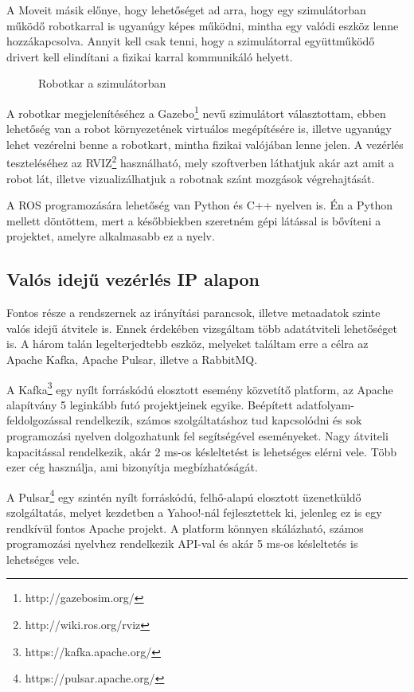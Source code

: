\documentclass[11pt,a4paper,oneside]{article}
\newcommand{\insertfig}[4]{
	\vspace*{2mm}
	\begin{figure}[#4]
		\center
		\resizebox{#3}{!}{\texttt{[image: images/\#1]}}
		\parbox{0.8\textwidth}{\vspace*{4mm}\caption{{#2}}\small\label{fig:#1}}
	\end{figure}
	\vspace*{-2\parskip}
}
\begin{document}
A Moveit másik előnye, hogy lehetőséget ad arra, hogy egy szimulátorban működő robotkarral is ugyanúgy képes működni, mintha egy valódi eszköz lenne hozzákapcsolva. Annyit kell csak tenni, hogy a szimulátorral együttműködő drivert kell elindítani a fizikai karral kommunikáló helyett.

\insertfig{ur5e_sim}{Robotkar a szimulátorban}{6cm}{h!}

A robotkar megjelenítéséhez a Gazebo\footnote{http://gazebosim.org/} nevű szimulátort választottam, ebben lehetőség van a robot környezetének virtuálos megépítésére is, illetve ugyanúgy lehet vezérelni benne a robotkart, mintha fizikai valójában lenne jelen. A vezérlés teszteléséhez az RVIZ\footnote{http://wiki.ros.org/rviz} használható, mely szoftverben láthatjuk akár azt amit a robot lát, illetve vizualizálhatjuk a robotnak szánt mozgások végrehajtását.

A ROS programozására lehetőség van Python és C++ nyelven is. Én a Python mellett döntöttem, mert a későbbiekben szeretném gépi látással is bővíteni a projektet, amelyre alkalmasabb ez a nyelv.

\subsection{Valós idejű vezérlés IP alapon}

Fontos része a rendszernek az irányítási parancsok, illetve metaadatok szinte valós idejű átvitele is. Ennek érdekében vizsgáltam több adatátviteli lehetőséget is. A három talán legelterjedtebb eszköz, melyeket találtam erre a célra az Apache Kafka, Apache Pulsar, illetve a RabbitMQ.

A Kafka\footnote{https://kafka.apache.org/} egy nyílt forráskódú elosztott esemény közvetítő platform, az Apache alapítvány 5 leginkább futó projektjeinek egyike. Beépített adatfolyam-feldolgozással rendelkezik, számos szolgáltatáshoz tud kapcsolódni és sok programozási nyelven dolgozhatunk fel segítségével eseményeket. Nagy átviteli kapacitással rendelkezik, akár 2 ms-os késleltetést is lehetséges elérni vele. Több ezer cég használja, ami bizonyítja megbízhatóságát.

A Pulsar\footnote{https://pulsar.apache.org/} egy szintén nyílt forráskódú, felhő-alapú elosztott üzenetküldő szolgáltatás, melyet kezdetben a Yahoo!-nál fejlesztettek ki, jelenleg ez is egy rendkívül fontos Apache projekt. A platform könnyen skálázható, számos programozási nyelvhez rendelkezik API-val és akár 5 ms-os késleltetés is lehetséges vele.
\end{document}
